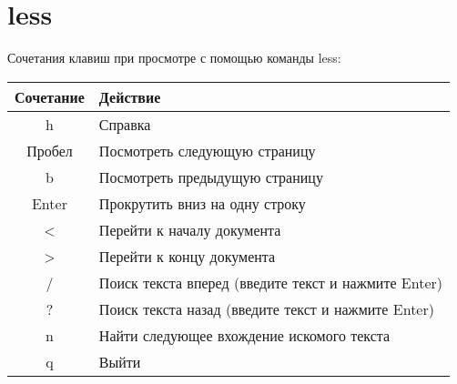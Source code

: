 \section{less}

Сочетания клавиш при просмотре с помощью команды less:

\begin{tabular}{|c|l|}
\hline
\rowcolor{gray!40}
Сочетание & Действие \\
\hline
h & Справка \\
Пробел & Посмотреть следующую страницу \\
b & Посмотреть предыдущую страницу \\
Enter & Прокрутить вниз на одну строку \\
< & Перейти к началу документа \\
> & Перейти к концу документа \\
/ & Поиск текста вперед (введите текст и нажмите Enter) \\
? & Поиск текста назад (введите текст и нажмите Enter) \\
n & Найти следующее вхождение искомого текста \\
q & Выйти \\
\hline
\end{tabular}
